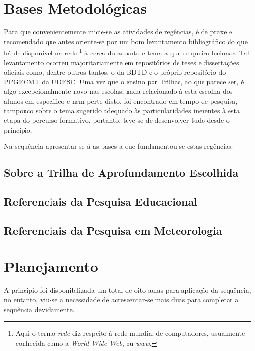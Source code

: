 \section{Bases Metodológicas} %
\label{sec:Bases Metodológicas}
Para que convenientemente inicie-se as atividades de regências, é de praxe e recomendado que antes oriente-se por um bom levantamento bibliográfico do que há de disponível na rede \footnote{Aqui o termo \textit{rede} diz respeito à rede mundial de computadores, usualmente conhecida como a \textit{World Wide Web}, ou \textit{www}.} à cerca do assunto e tema a que se queira lecionar. Tal levantamento ocorreu majoritariamente em repositórios de teses e dissertações oficiais como, dentre outros tantos, o da \ac{BDTD} e o próprio repositório do \ac{PPGECMT} da \ac{UDESC}. Uma vez que o ensino por Trilhas, ao que parece ser, é algo excepcionalmente novo nas escolas, nada relacionado à esta escolha dos alunos em específico e nem perto disto, foi encontrado em tempo de pesquisa, tampouco sobre o tema sugerido adequado às particularidades inerentes à esta etapa do percurso formativo, portanto, teve-se de desenvolver tudo desde o princípio.

Na sequência apresentar-se-á as bases a que fundamentou-se estas regências.

\subsection{Sobre a Trilha de Aprofundamento Escolhida} %
\label{sub:Sobre a Trilha de Aprofundamento Escolhida}

\subsection{Referenciais da Pesquisa Educacional} %
\label{sub:Referenciais da Pesquisa Educacional}

\subsection{Referenciais da Pesquisa em Meteorologia} %
\label{sub:Referenciais da Pesquisa em Meteorologia}



\section{Planejamento} %
A princípio foi disponibilizada um total de oito aulas para aplicação da sequência, no entanto, viu-se a necessidade de acrescentar-se mais duas para completar a sequência devidamente.
\vspace{10pt}

